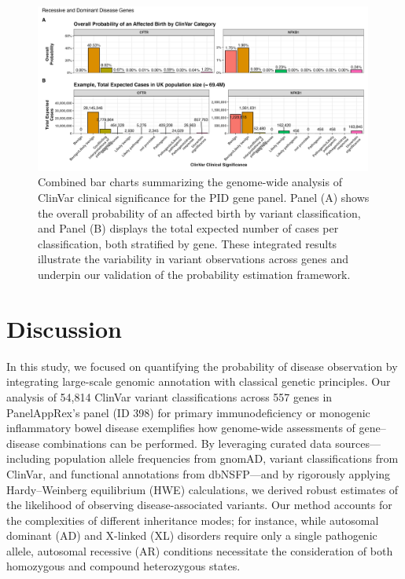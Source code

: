 \begin{figure}[ht]
  \centering
  \includegraphics[width=0.99\textwidth]{../images/all_genes_combined_bar_charts_mini.png}
  \caption{Combined bar charts summarizing the genome-wide analysis of ClinVar clinical significance for the PID gene panel. Panel (A) shows the overall probability of an affected birth by variant classification, and Panel (B) displays the total expected number of cases per classification, both stratified by gene. These integrated results illustrate the variability in variant observations across genes and underpin our validation of the probability estimation framework.}
  \label{fig:all_genes_combined_bar_charts_mini}
\end{figure}

\FloatBarrier
\section{Discussion}

In this study, we focused on quantifying the probability of disease observation by integrating large-scale genomic annotation with classical genetic principles. Our analysis of 54,814 ClinVar variant classifications across 557 genes in PanelAppRex’s panel (ID 398) for primary immunodeficiency or monogenic inflammatory bowel disease exemplifies how genome-wide assessments of gene–disease combinations can be performed. By leveraging curated data sources—including population allele frequencies from gnomAD, variant classifications from ClinVar, and functional annotations from dbNSFP—and by rigorously applying Hardy–Weinberg equilibrium (HWE) calculations, we derived robust estimates of the likelihood of observing disease-associated variants. Our method accounts for the complexities of different inheritance modes; for instance, while autosomal dominant (AD) and X-linked (XL) disorders require only a single pathogenic allele, autosomal recessive (AR) conditions necessitate the consideration of both homozygous and compound heterozygous states.

